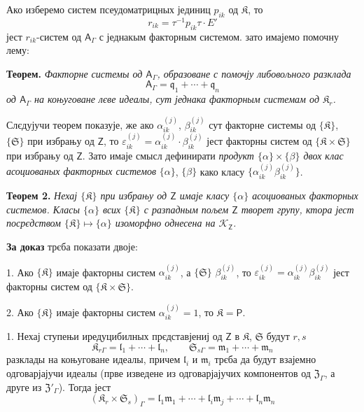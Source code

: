 \documentclass[11pt]{article}
\begin{document}
Ако изберемо систем псеудоматрицных јединиц \(p_{ik}\) од \(\mathfrak K\), то
\[
r_{ik}=\tau^{-1}p_{ik}\tau\cdot E'
\]
јест \(r_{ik}\)-систем од \(\mathsf{A}_\Gamma\) с једнакым факторным системом. зато имајемо помочну лему:

\textbf{Теорем.} \emph{Факторне системы од \(\mathsf{A}_\Gamma\), образоване с помочју либовољного разклада}
\[
\mathsf{A}_\Gamma=\mathfrak q_1+\cdots+\mathfrak q_n
\]
\emph{од \(\mathsf{A}_\Gamma\) на коњуговане лєве идеалы, сут једнака факторным системам од \(\mathfrak K_r\).}

Слєдујучи теорем показује, же ако \(\alpha_{ik}^{(j)}\), \(\beta_{ik}^{(j)}\) сут факторне системы од \(\{\mathfrak K\}\), \(\{\mathfrak S\}\) при избрању од \(\mathsf{Z}\), то \(\varepsilon_{ik}^{(j)}=\alpha_{ik}^{(j)}\cdot\beta_{ik}^{(j)}\) јест факторны систем од \(\{\mathfrak K\times\mathfrak S\}\) при избрању од \(\mathsf{Z}\). Зато имаје смысл дефинирати \emph{продукт \(\{\alpha\}\times\{\beta\}\) двох клас асоциованых факторных системов} \(\{\alpha\}\), \(\{\beta\}\) како класу \(\{\alpha_{ik}^{(j)}\beta_{ik}^{(j)}\}\).

\textbf{Теорем 2.} \emph{Нехај \(\{\mathfrak K\}\) при избрању од \(\mathsf{Z}\) имаје класу \(\{\alpha\}\) асоциованых факторных системов. Класы \(\{\alpha\}\) всих \(\{\mathfrak K\}\) с разпадным пољем \(\mathsf{Z}\) творет групу, ктора јест посрєдством \(\{\mathfrak K\}\mapsto\{\alpha\}\) изоморфно однесена на \(\mathscr K_{\mathsf{Z}}\).}

\textbf{За доказ} трєба показати двоје:

1. Ако \(\{\mathfrak K\}\) имаје факторны систем \(\alpha_{ik}^{(j)}\), а \(\{\mathfrak S\}\) \(\beta_{ik}^{(j)}\), то \(\varepsilon_{ik}^{(j)}=\alpha_{ik}^{(j)}\beta_{ik}^{(j)}\) јест факторны систем од \(\{\mathfrak K\times\mathfrak S\}\).

2. Ако \(\{\mathfrak K\}\) имаје факторны систем \(\alpha_{ik}^{(j)}=1\), то \(\mathfrak K=\mathsf P\).

1. Нехај ступењи иредуцибилных прєдставјениј од \(\mathsf{Z}\) в \(\mathfrak K\), \(\mathfrak S\) будут \(r,s\)
\[
\mathfrak K_{r\Gamma}=\mathfrak l_1+\cdots+\mathfrak l_n,\qquad
\mathfrak S_{s\Gamma}=\mathfrak m_1+\cdots+\mathfrak m_n
\]
разклады на коњуговане идеалы, причем \(\mathfrak l_i\) и \(\mathfrak m_i\) трєба да будут взајемно одговарјајучи идеалы (прве изведене из одговарјајучих компонентов од \(\mathfrak Z_\Gamma\), а друге из \(\mathfrak Z'_\Gamma\)). Тогда јест
\[
(\mathfrak K_r\times\mathfrak S_s)_\Gamma
=\mathfrak l_1\mathfrak m_1+\cdots+\mathfrak l_i\mathfrak m_j+\cdots+\mathfrak l_n\mathfrak m_n
\]
\end{document}
